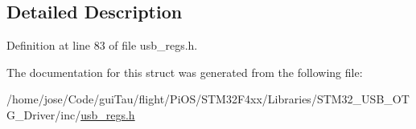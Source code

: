 \subsection{Detailed Description}


Definition at line 83 of file usb\-\_\-regs.\-h.



The documentation for this struct was generated from the following file\-:\begin{DoxyCompactItemize}
\item 
/home/jose/\-Code/gui\-Tau/flight/\-Pi\-O\-S/\-S\-T\-M32\-F4xx/\-Libraries/\-S\-T\-M32\-\_\-\-U\-S\-B\-\_\-\-O\-T\-G\-\_\-\-Driver/inc/\hyperlink{_s_t_m32_f4xx_2_libraries_2_s_t_m32___u_s_b___o_t_g___driver_2inc_2usb__regs_8h}{usb\-\_\-regs.\-h}\end{DoxyCompactItemize}
